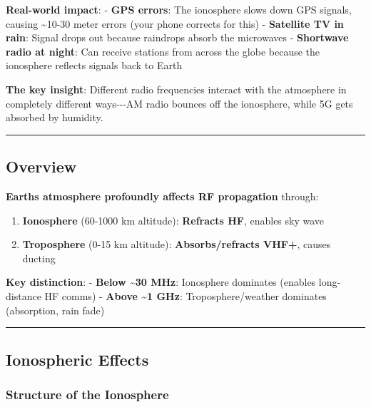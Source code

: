 \textbf{Real-world impact}: - \textbf{GPS errors}: The ionosphere slows
down GPS signals, causing \textasciitilde10-30 meter errors (your phone
corrects for this) - \textbf{Satellite TV in rain}: Signal drops out
because raindrops absorb the microwaves - \textbf{Shortwave radio at
night}: Can receive stations from across the globe because the
ionosphere reflects signals back to Earth

\textbf{The key insight}: Different radio frequencies interact with the
atmosphere in completely different ways-\/-\/-AM radio bounces off the
ionosphere, while 5G gets absorbed by humidity.

\begin{center}\rule{0.5\linewidth}{0.5pt}\end{center}

\subsection{Overview}\label{overview}

\textbf{Earth\textquotesingle s atmosphere profoundly affects RF
propagation} through:

\begin{enumerate}
\def\labelenumi{\arabic{enumi}.}
\tightlist
\item
  \textbf{Ionosphere} (60-1000 km altitude): \textbf{Refracts HF},
  enables sky wave
\item
  \textbf{Troposphere} (0-15 km altitude): \textbf{Absorbs/refracts
  VHF+}, causes ducting
\end{enumerate}

\textbf{Key distinction}: - \textbf{Below \textasciitilde30 MHz}:
Ionosphere dominates (enables long-distance HF comms) - \textbf{Above
\textasciitilde1 GHz}: Troposphere/weather dominates (absorption, rain
fade)

\begin{center}\rule{0.5\linewidth}{0.5pt}\end{center}

\subsection{Ionospheric Effects}\label{ionospheric-effects}

\subsubsection{Structure of the
Ionosphere}\label{structure-of-the-ionosphere}

